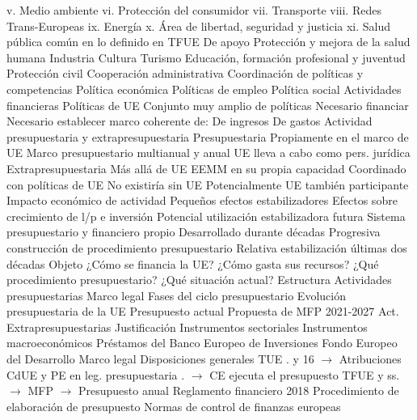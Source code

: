 \documentclass{nuevotema}
\begin{document}
\begin{esquemal}
				\4[] v. Medio ambiente
				\4[] vi. Protección del consumidor
				\4[] vii. Transporte
				\4[] viii. Redes Trans-Europeas
				\4[] ix. Energía
				\4[] x. Área de libertad, seguridad y justicia
				\4[] xi. Salud pública común en lo definido en TFUE
				\4 De apoyo
				\4[] Protección y mejora de la salud humana
				\4[] Industria
				\4[] Cultura
				\4[] Turismo
				\4[] Educación, formación profesional y juventud
				\4[] Protección civil
				\4[] Cooperación administrativa
				\4 Coordinación de políticas y competencias
				\4[] Política económica
				\4[] Políticas de empleo
				\4[] Política social
			\3 Actividades financieras
				\4 Políticas de UE
				\4[] Conjunto muy amplio de políticas
				\4 Necesario financiar
				\4 Necesario establecer marco coherente de:
				\4[] De ingresos
				\4[] De gastos
			\3 Actividad presupuestaria y extrapresupuestaria
				\4 Presupuestaria
				\4[] Propiamente en el marco de UE
				\4[] Marco presupuestario multianual y anual
				\4[] UE lleva a cabo como pers. jurídica
				\4 Extrapresupuestaria
				\4[] Más allá de UE
				\4[] EEMM en su propia capacidad
				\4[] Coordinado con políticas de UE
				\4[] No existiría sin UE
				\4[] Potencialmente UE también participante
			\3 Impacto económico de actividad
				\4 Pequeños efectos estabilizadores
				\4 Efectos sobre crecimiento de l/p e inversión
				\4 Potencial utilización estabilizadora futura
			\3 Sistema presupuestario y financiero propio
				\4 Desarrollado durante décadas
				\4 Progresiva construcción de procedimiento presupuestario
				\4 Relativa estabilización últimas dos décadas
		\2 Objeto
			\3 ¿Cómo se financia la UE?
			\3 ¿Cómo gasta sus recursos?
			\3 ¿Qué procedimiento presupuestario?
			\3 ¿Qué situación actual?
		\2 Estructura
			\3 Actividades presupuestarias
				\4 Marco legal
				\4 Fases del ciclo presupuestario
				\4 Evolución presupuestaria de la UE
				\4 Presupuesto actual
				\4 Propuesta de MFP 2021-2027
			\3 Act. Extrapresupuestarias
				\4 Justificación
				\4 Instrumentos sectoriales
				\4 Instrumentos macroeconómicos
				\4 Préstamos del Banco Europeo de Inversiones
				\4 Fondo Europeo del Desarrollo
	\1 
		\2 Marco legal
			\3 Disposiciones generales
				\4 TUE
				. y 16
				\4[] $\to$ Atribuciones CdUE y PE en leg. presupuestaria
				.
				\4[] $\to$ CE ejecuta el presupuesto
				\4 TFUE
				 y ss.
				\4[] $\to$ MFP
				\4[] $\to$ Presupuesto anual
				\4 Reglamento financiero 2018
				\4[] Procedimiento de elaboración de presupuesto
				\4[] Normas de control de finanzas europeas

\end{esquemal}
\end{document}
